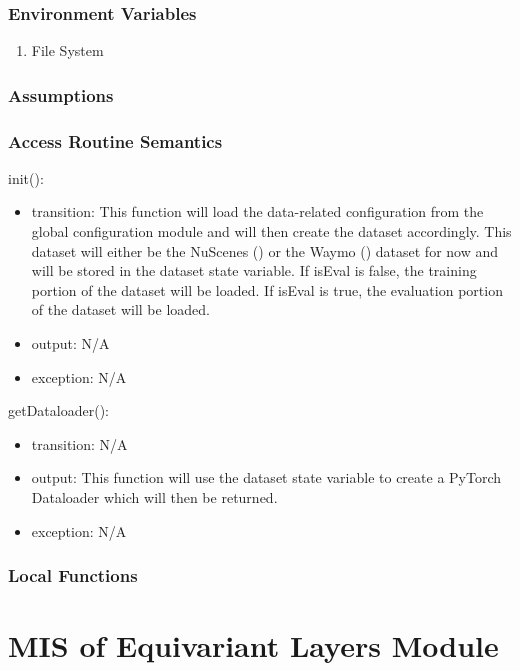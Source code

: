 \documentclass[12pt, titlepage]{article}
\begin{document}
\subsubsection{Environment Variables}
\begin{enumerate}
  \item File System
\end{enumerate}

\subsubsection{Assumptions}



\subsubsection{Access Routine Semantics}
\noindent init():
\begin{itemize}
\item transition: This function will load the data-related configuration from the global configuration module and will then create the dataset accordingly.
This dataset will either be the NuScenes (\cite{caesar2020nuscenes}) or the Waymo (\cite{sun2020scalability}) dataset for now and will be stored in the dataset state variable. If isEval is false,
the training portion of the dataset will be loaded. If isEval is true, the evaluation portion of the dataset will be loaded.
\item output: N/A
\item exception: N/A
\end{itemize}

\noindent getDataloader():
\begin{itemize}
  \item transition: N/A
  \item output: This function will use the dataset state variable to create a PyTorch Dataloader which will then be returned.
  \item exception: N/A
\end{itemize}

\subsubsection{Local Functions}

\newpage

\section{MIS of Equivariant Layers Module} \label{Module} 
\end{document}
